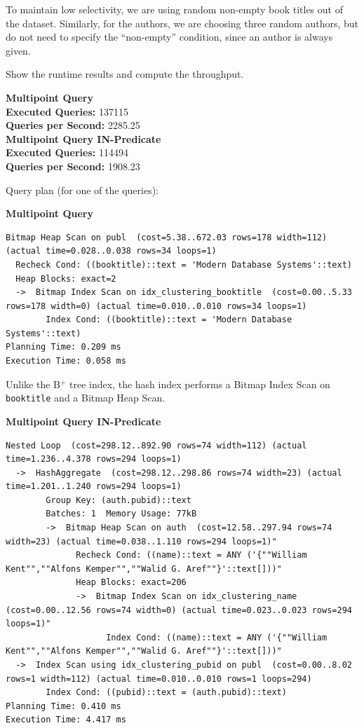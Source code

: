 \documentclass[11pt]{scrartcl}
\begin{document}
To maintain low selectivity, we are using random non-empty book titles out of the dataset.
Similarly, for the authors, we are choosing three random authors, but do not need to specify the \enquote{non-empty}
condition, since an author is always given.

Show the runtime results and compute the throughput.

\textbf{Multipoint Query}\\
\textbf{Executed Queries: } 137115\\
\textbf{Queries per Second: } 2285.25 \\

\textbf{Multipoint Query IN-Predicate}\\
\textbf{Executed Queries: } 114494\\
\textbf{Queries per Second: } 1908.23

Query plan (for one of the queries):

\textbf{Multipoint Query}
{\small
\parskip0pt\begin{verbatim}
Bitmap Heap Scan on publ  (cost=5.38..672.03 rows=178 width=112) (actual time=0.028..0.038 rows=34 loops=1)
  Recheck Cond: ((booktitle)::text = 'Modern Database Systems'::text)
  Heap Blocks: exact=2
  ->  Bitmap Index Scan on idx_clustering_booktitle  (cost=0.00..5.33 rows=178 width=0) (actual time=0.010..0.010 rows=34 loops=1)
        Index Cond: ((booktitle)::text = 'Modern Database Systems'::text)
Planning Time: 0.209 ms
Execution Time: 0.058 ms
\end{verbatim}}

Unlike the B$^+$ tree index, the hash index performs a Bitmap Index Scan on \texttt{booktitle} and a Bitmap Heap Scan.

\textbf{Multipoint Query IN-Predicate}
{\small
\parskip0pt\begin{verbatim}
Nested Loop  (cost=298.12..892.90 rows=74 width=112) (actual time=1.236..4.378 rows=294 loops=1)
  ->  HashAggregate  (cost=298.12..298.86 rows=74 width=23) (actual time=1.201..1.240 rows=294 loops=1)
        Group Key: (auth.pubid)::text
        Batches: 1  Memory Usage: 77kB
        ->  Bitmap Heap Scan on auth  (cost=12.58..297.94 rows=74 width=23) (actual time=0.038..1.110 rows=294 loops=1)"
              Recheck Cond: ((name)::text = ANY ('{""William Kent"",""Alfons Kemper"",""Walid G. Aref""}'::text[]))"
              Heap Blocks: exact=206
              ->  Bitmap Index Scan on idx_clustering_name  (cost=0.00..12.56 rows=74 width=0) (actual time=0.023..0.023 rows=294 loops=1)"
                    Index Cond: ((name)::text = ANY ('{""William Kent"",""Alfons Kemper"",""Walid G. Aref""}'::text[]))"
  ->  Index Scan using idx_clustering_pubid on publ  (cost=0.00..8.02 rows=1 width=112) (actual time=0.010..0.010 rows=1 loops=294)
        Index Cond: ((pubid)::text = (auth.pubid)::text)
Planning Time: 0.410 ms
Execution Time: 4.417 ms
\end{verbatim}}
\end{document}
